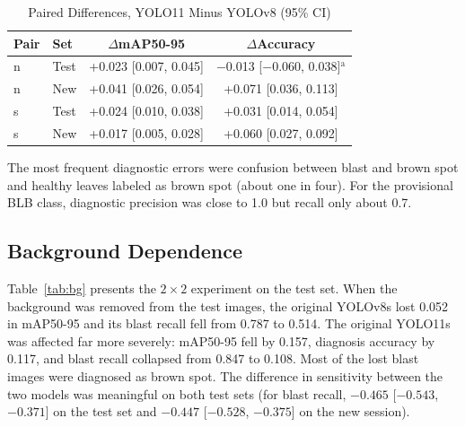 \documentclass[conference,a4paper]{IEEEtran}
\begin{document}
\begin{table}[htbp]
\caption{Paired Differences, YOLO11 Minus YOLOv8 (95\% CI)}
\begin{center}
\setlength{\tabcolsep}{2pt}
\begin{tabular}{|l|l|c|c|}
\hline
\textbf{Pair} & \textbf{Set} & \textbf{$\Delta$mAP50-95} & \textbf{$\Delta$Accuracy} \\
\hline
n & Test & +0.023 [0.007, 0.045] & $-$0.013 [$-$0.060, 0.038]$^{\mathrm{a}}$ \\
n & New & +0.041 [0.026, 0.054] & +0.071 [0.036, 0.113] \\
s & Test & +0.024 [0.010, 0.038] & +0.031 [0.014, 0.054] \\
s & New & +0.017 [0.005, 0.028] & +0.060 [0.027, 0.092] \\
\hline
\end{tabular}
\par{}
\label{tab:paired}
\end{center}
\end{table}

The most frequent diagnostic errors were confusion between blast and brown spot and healthy leaves labeled as brown spot (about one in four). For the provisional BLB class, diagnostic precision was close to 1.0 but recall only about 0.7.

\subsection{Background Dependence}
Table~\ref{tab:bg} presents the $2\times2$ experiment on the test set. When the background was removed from the test images, the original YOLOv8s lost 0.052 in mAP50-95 and its blast recall fell from 0.787 to 0.514. The original YOLO11s was affected far more severely: mAP50-95 fell by 0.157, diagnosis accuracy by 0.117, and blast recall collapsed from 0.847 to 0.108. Most of the lost blast images were diagnosed as brown spot. The difference in sensitivity between the two models was meaningful on both test sets (for blast recall, $-0.465$ [$-0.543$, $-0.371$] on the test set and $-0.447$ [$-0.528$, $-0.375$] on the new session).
\end{document}
